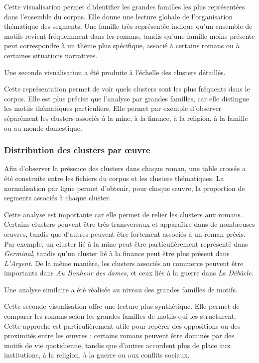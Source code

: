 \documentclass{article}
\begin{document}
Cette visualisation permet d'identifier les grandes familles les plus représentées dans l'ensemble du corpus. Elle donne une lecture globale de l'organisation thématique des segments. Une famille très représentée indique qu'un ensemble de motifs revient fréquemment dans les romans, tandis qu'une famille moins présente peut correspondre à un thème plus spécifique, associé à certains romans ou à certaines situations narratives.

Une seconde visualisation a été produite à l'échelle des clusters détaillés.


Cette représentation permet de voir quels clusters sont les plus fréquents dans le corpus. Elle est plus précise que l'analyse par grandes familles, car elle distingue les motifs thématiques particuliers. Elle permet par exemple d'observer séparément les clusters associés à la mine, à la finance, à la religion, à la famille ou au monde domestique.

\subsubsection{Distribution des clusters par œuvre}

Afin d'observer la présence des clusters dans chaque roman, une table croisée a été construite entre les fichiers du corpus et les clusters thématiques. La normalisation par ligne permet d'obtenir, pour chaque œuvre, la proportion de segments associés à chaque cluster.



Cette analyse est importante car elle permet de relier les clusters aux romans. Certains clusters peuvent être très transversaux et apparaître dans de nombreuses œuvres, tandis que d'autres peuvent être fortement associés à un roman précis. Par exemple, un cluster lié à la mine peut être particulièrement représenté dans \textit{Germinal}, tandis qu'un cluster lié à la finance peut être plus présent dans \textit{L'Argent}. De la même manière, les clusters associés au commerce peuvent être importants dans \textit{Au Bonheur des dames}, et ceux liés à la guerre dans \textit{La Débâcle}.

Une analyse similaire a été réalisée au niveau des grandes familles de motifs.



Cette seconde visualisation offre une lecture plus synthétique. Elle permet de comparer les romans selon les grandes familles de motifs qui les structurent. Cette approche est particulièrement utile pour repérer des oppositions ou des proximités entre les œuvres : certains romans peuvent être dominés par des motifs de vie quotidienne, tandis que d'autres accordent plus de place aux institutions, à la religion, à la guerre ou aux conflits sociaux.
\end{document}
